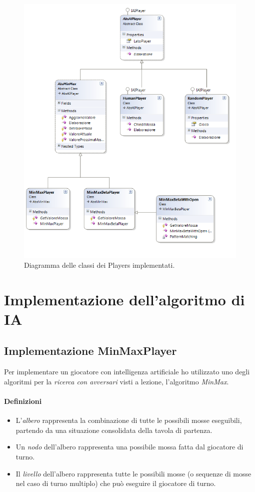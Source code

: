 \documentclass[paper=a4, fontsize=11pt]{scrartcl}	%
\numberwithin{equation}{section}															%
\numberwithin{figure}{section}																%
\numberwithin{table}{section}																%
\begin{document}
\begin{figure}[h]
\centering
        \includegraphics[totalheight=18cm]{Iplayer.png}
    \caption{Diagramma delle classi dei Players implementati.}
    \label{fig:verticalcell}
\end{figure}



\section{Implementazione dell'algoritmo di IA}
\subsection{Implementazione MinMaxPlayer}
Per implementare un giocatore con intelligenza artificiale ho utilizzato uno degli algoritmi per la \textit{ ricerca con avversari} visti a lezione, l'algoritmo \textit{ MinMax}.
\paragraph{Definizioni}
\begin{itemize}
\item L'\textit{albero} rappresenta la combinazione di tutte le possibili mosse eseguibili, partendo da una situazione consolidata della tavola di partenza.
\item Un \textit{nodo} dell'albero rappresenta una possibile mossa fatta dal giocatore di turno.
\item Il \textit{livello} dell'albero rappresenta tutte le possibili mosse (o sequenze di mosse nel caso di turno multiplo) che pu\`o eseguire il giocatore di turno.
\end{itemize}
\end{document}
